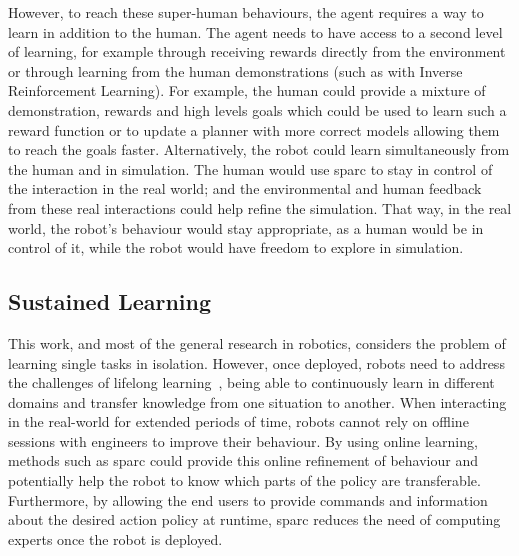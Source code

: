 However, to reach these super-human behaviours, the agent requires a way to learn in addition to the human. The agent needs to have access to a second level of learning, for example through receiving rewards directly from the environment or through learning from the human demonstrations (such as with Inverse Reinforcement Learning). For example, the human could provide a mixture of demonstration, rewards and high levels goals which could be used to learn such a reward function or to update a planner with more correct models allowing them to reach the goals faster. Alternatively, the robot could learn simultaneously from the human and in simulation. The human would use \gls{sparc} to stay in control of the interaction in the real world; and the environmental and human feedback from these real interactions could help refine the simulation. That way, in the real world, the robot's behaviour would stay appropriate, as a human would be in control of it, while the robot would have freedom to explore in simulation.

\subsection{Sustained Learning}

This work, and most of the general research in robotics, considers the problem of learning single tasks in isolation. However, once deployed, robots need to address the challenges of lifelong learning~\citep{thrun1995lifelong}, being able to continuously learn in different domains and transfer knowledge from one situation to another. When interacting in the real-world for extended periods of time, robots cannot rely on offline sessions with engineers to improve their behaviour. By using online learning, methods such as \gls{sparc} could provide this online refinement of behaviour and potentially help the robot to know which parts of the policy are transferable. Furthermore, by allowing the end users to provide commands and information about the desired action policy at runtime, \gls{sparc} reduces the need of computing experts once the robot is deployed. %

